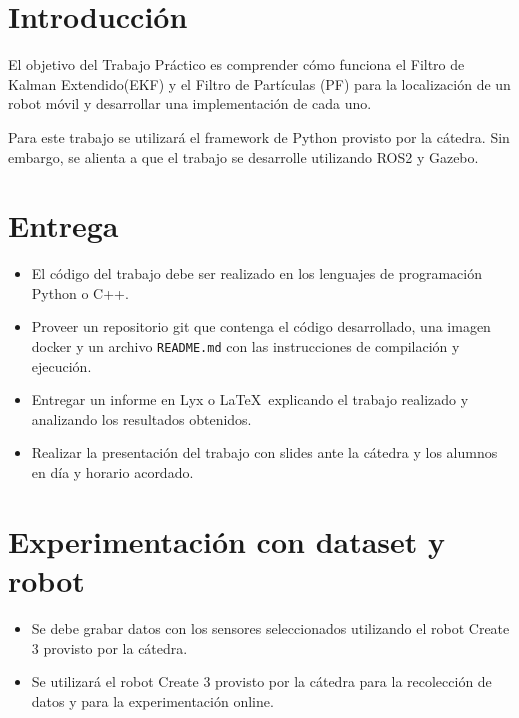 \documentclass[tp]{lcc}
\begin{document}
	\maketitle
	
	
	\section{Introducción}
	
	El objetivo del Trabajo Práctico es comprender cómo funciona el Filtro de Kalman Extendido(EKF) y el Filtro de Partículas (PF) para la localización de un robot móvil y desarrollar una implementación de cada uno.
	
	Para este trabajo se utilizará el framework de Python provisto por la cátedra. Sin embargo, se alienta a que el trabajo se desarrolle utilizando ROS2 y Gazebo.
		
	\section{Entrega}
	\begin{itemize}
		
		\item El código del trabajo debe ser realizado en los lenguajes de programación Python o C++.
		
		\item Proveer un repositorio git que contenga el código desarrollado, una imagen docker y un archivo \lstinline{README.md} con las instrucciones de compilación y ejecución.
		
		\item Entregar un informe en Lyx o \LaTeX\  explicando el trabajo realizado y analizando los resultados obtenidos.
		
		\item Realizar la presentación del trabajo con slides ante la cátedra y los alumnos en día y horario acordado.
	\end{itemize}

	
	\section{Experimentación con dataset y robot}
	\begin{itemize}
		\item Se debe grabar datos con los sensores seleccionados utilizando el robot Create 3 provisto por la cátedra.
		
		\item Se utilizará el robot Create 3 provisto por la cátedra para la recolección de datos y para la experimentación online.
	\end{itemize}
	
\end{document}
